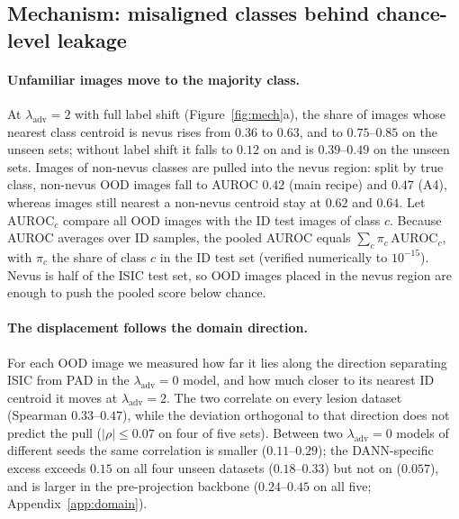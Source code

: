 \documentclass{midl}
\newcommand{\lam}{\lambda_{\mathrm{adv}}}
\begin{document}
\subsection{Mechanism: misaligned classes behind chance-level leakage}
\label{sec:mechanism}
\label{sec:nonmediation}

\paragraph{Unfamiliar images move to the majority class.} At $\lam=2$ with full label shift (Figure~\ref{fig:mech}a),
the share of \texttt{} images whose nearest class centroid is nevus rises from
$0.36$ to $0.63$, and to $0.75$--$0.85$ on the unseen sets; without label shift it falls to
$0.12$ on \texttt{} and is $0.39$--$0.49$ on the unseen sets. Images of non-nevus classes are pulled into the nevus region:
split by true class, non-nevus OOD images fall to AUROC $0.42$ (main recipe) and $0.47$ (A4),
whereas images still nearest a non-nevus centroid stay at $0.62$ and $0.64$. Let $\mathrm{AUROC}_c$ compare all OOD images with the ID test images of
class $c$. Because AUROC averages over ID samples, the pooled AUROC equals
$\sum_c \pi_c\,\mathrm{AUROC}_c$, with $\pi_c$ the share of class $c$ in the ID test set (verified
numerically to $10^{-15}$). Nevus is half of the ISIC test set, so OOD images placed in the nevus
region are enough to push the pooled score below chance.

\paragraph{The displacement follows the domain direction.} For each OOD image we measured
how far it lies along the direction separating ISIC from PAD in the $\lam=0$ model, and how
much closer to its nearest ID centroid it moves at $\lam=2$. The two correlate on every
lesion dataset (Spearman $0.33$--$0.47$), while the deviation orthogonal to that direction
does not predict the pull ($|\rho|\le0.07$ on four of five sets). Between two $\lam=0$ models
of different seeds the same correlation is smaller ($0.11$--$0.29$); the DANN-specific
excess exceeds $0.15$ on all four unseen datasets ($0.18$--$0.33$) but not on
\texttt{} ($0.057$), and is larger in the pre-projection backbone ($0.24$--$0.45$
on all five; Appendix~\ref{app:domain}).
\end{document}
